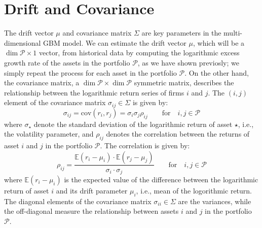 \documentclass[11pt]{article}
\theoremstyle{definition}
\begin{document}
\section*{Drift and Covariance}
The drift vector $\mu$ and covariance matrix $\Sigma$ are key parameters in the multi-dimensional GBM model.
We can estimate the drift vector $\mu$, which will be a $\dim\mathcal{P}\times{1}$ vector, from historical data by computing the logarithmic excess growth rate of the assets in the portfolio $\mathcal{P}$, 
as we have shown previosly; we simply repeat the process for each asset in the portfolio $\mathcal{P}$.
On the other hand, the covariance matrix, a $\dim\mathcal{P}\times\dim\mathcal{P}$ symmetric matrix, describes the relationship between the logarithmic return series of firms $i$ and $j$.
The $(i,j)$ element of the covariance matrix $\sigma_{ij}\in\Sigma$ is given by:
\begin{equation*}
    \sigma_{ij} = \text{cov}\left(r_{i},r_{j}\right) = \sigma_{i}\sigma_{j}\rho_{ij}\qquad\text{for}\quad{i,j \in \mathcal{P}}
\end{equation*}
where $\sigma_{\star}$ denote the standard deviation of the logarithmic return of asset $\star$, i.e., the volatility parameter, and $\rho_{ij}$ 
denotes the correlation between the returns of asset $i$ and $j$ in the portfolio $\mathcal{P}$. The correlation is given by:
\begin{equation*}
\rho_{ij} = \frac{\mathbb{E}(r_{i}-\mu_{i})\cdot\mathbb{E}(r_{j} - \mu_{j})}{\sigma_{i}\cdot\sigma_{j}}\qquad\text{for}\quad{i,j \in \mathcal{P}}
\end{equation*}
where $\mathbb{E}(r_{i}-\mu_{i})$ is the expected value of the difference between the logarithmic return of asset $i$ and its drift parameter 
$\mu_{i}$, i.e., mean of the logorithmic return. The diagonal elements of the covariance matrix $\sigma_{ii}\in\Sigma$ are the variances, 
while the off-diagonal measure the relationship between assets $i$ and $j$ in the portfolio $\mathcal{P}$.
\end{document}
